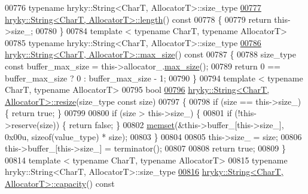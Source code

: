 \begin{DoxyCode}
00776 \textcolor{keyword}{typename} hryky::String<CharT, AllocatorT>::size\_type
\hypertarget{string_8h_source_l00777}{}\hyperlink{classhryky_1_1_string_a908a0c14b8c8af6123da3508f3e5d1ce}{00777} \hyperlink{classhryky_1_1_string}{hryky::String<CharT, AllocatorT>::length}()\textcolor{keyword}{ const}
00778 \textcolor{keyword}{}\{
00779     \textcolor{keywordflow}{return} this->size\_;
00780 \}
00784 \textcolor{keyword}{template} < \textcolor{keyword}{typename} CharT, \textcolor{keyword}{typename} AllocatorT>
00785 \textcolor{keyword}{typename} hryky::String<CharT, AllocatorT>::size\_type
\hypertarget{string_8h_source_l00786}{}\hyperlink{classhryky_1_1_string_aafb6d82457bc1b598e6fb60dee15d562}{00786} \hyperlink{classhryky_1_1_string}{hryky::String<CharT, AllocatorT>::max_size}()\textcolor{keyword}{ const}
00787 \textcolor{keyword}{}\{
00788     size\_type \textcolor{keyword}{const} buffer\_max\_size = this->allocator\_.\hyperlink{classhryky_1_1_string_aafb6d82457bc1b598e6fb60dee15d562}{max_size}();
00789     \textcolor{keywordflow}{return} 0 == buffer\_max\_size ? 0 : buffer\_max\_size - 1;
00790 \}
00794 \textcolor{keyword}{template} < \textcolor{keyword}{typename} CharT, \textcolor{keyword}{typename} AllocatorT>
00795 \textcolor{keywordtype}{bool}
\hypertarget{string_8h_source_l00796}{}\hyperlink{classhryky_1_1_string_ae2a52a7868534d2a48fd01db2ea35c1a}{00796} \hyperlink{classhryky_1_1_string}{hryky::String<CharT, AllocatorT>::resize}(size\_type \textcolor{keyword}{const} size)
00797 \{
00798     \textcolor{keywordflow}{if} (size == this->size\_) \{ \textcolor{keywordflow}{return} \textcolor{keyword}{true}; \}
00799 
00800     \textcolor{keywordflow}{if} (size > this->size\_) \{
00801         \textcolor{keywordflow}{if} (!this->reserve(size)) \{ \textcolor{keywordflow}{return} \textcolor{keyword}{false}; \}
00802         \hyperlink{namespacehryky_a50f9095eab4dc96e5fa813f8fc8fba7e}{memset}(&this->buffer\_[this->size\_], 0x00u, \textcolor{keyword}{sizeof}(value\_type) * size);
00803     \}
00804     
00805     this->size\_ = size;
00806     this->buffer\_[this->size\_] = terminator();
00807     
00808     \textcolor{keywordflow}{return} \textcolor{keyword}{true};
00809 \}
00814 \textcolor{keyword}{template} < \textcolor{keyword}{typename} CharT, \textcolor{keyword}{typename} AllocatorT>
00815 \textcolor{keyword}{typename} hryky::String<CharT, AllocatorT>::size\_type
\hypertarget{string_8h_source_l00816}{}\hyperlink{classhryky_1_1_string_afe570a5245b8ae9fb91ab0aebecc5b5a}{00816} \hyperlink{classhryky_1_1_string}{hryky::String<CharT, AllocatorT>::capacity}()\textcolor{keyword}{ const}

\end{DoxyCode}
